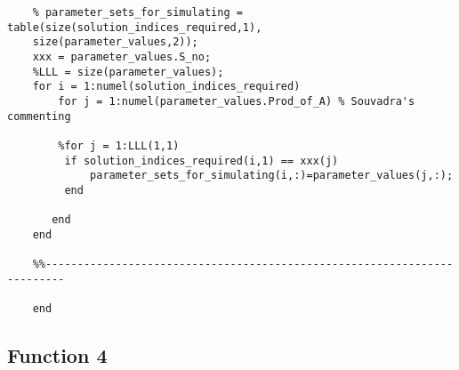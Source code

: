 \documentclass{article}
\begin{document}
\begin{verbatim}
    % parameter_sets_for_simulating = table(size(solution_indices_required,1),
    size(parameter_values,2));
    xxx = parameter_values.S_no;
    %LLL = size(parameter_values);
    for i = 1:numel(solution_indices_required)
        for j = 1:numel(parameter_values.Prod_of_A) % Souvadra's commenting
         
        %for j = 1:LLL(1,1)
         if solution_indices_required(i,1) == xxx(j)
             parameter_sets_for_simulating(i,:)=parameter_values(j,:);
         end
           
       end 
    end
    
    %%-------------------------------------------------------------------------
    
    end
\end{verbatim}

\subsection*{Function 4}
\end{document}
